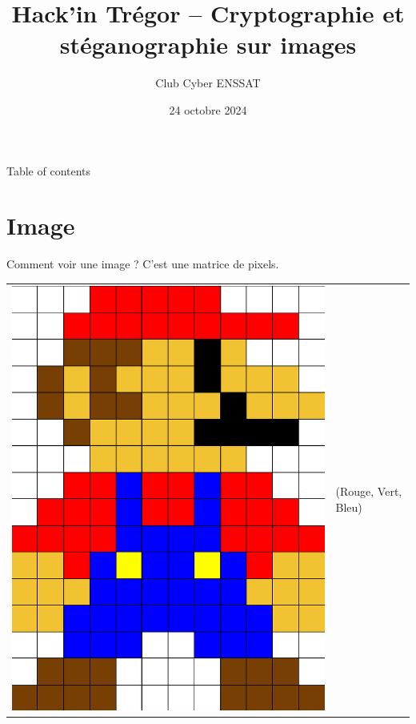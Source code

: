 \documentclass{beamer}
\title{Hack'in Trégor -- Cryptographie et stéganographie sur images}
\author{Club Cyber ENSSAT}
\date{24 octobre 2024}
\begin{document}
    \frame{\titlepage}

    \begin{frame}{Table of contents}
        \tableofcontents
    \end{frame}

    \section{Image}

    \begin{frame}{Comment voir une image ?}%
        C'est une matrice de pixels.

        \begin{center}
            \begin{tabular}{cp{200pt}}
                \includegraphics[scale=.17]{pics/pixels.png}
                &
                \vspace{-150pt}
                (Rouge, Vert, Bleu)


\end{tabular}
\end{center}
\end{frame}
\end{document}
